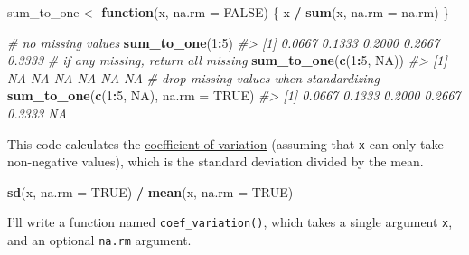 \documentclass[]{book}
\newenvironment{Shaded}{\begin{snugshade}}{\end{snugshade}}
\newcommand{\CommentTok}[1]{\textcolor[rgb]{0.56,0.35,0.01}{\textit{#1}}}
\newcommand{\ControlFlowTok}[1]{\textcolor[rgb]{0.13,0.29,0.53}{\textbf{#1}}}
\newcommand{\DataTypeTok}[1]{\textcolor[rgb]{0.13,0.29,0.53}{#1}}
\newcommand{\DecValTok}[1]{\textcolor[rgb]{0.00,0.00,0.81}{#1}}
\newcommand{\KeywordTok}[1]{\textcolor[rgb]{0.13,0.29,0.53}{\textbf{#1}}}
\newcommand{\NormalTok}[1]{#1}
\newcommand{\OperatorTok}[1]{\textcolor[rgb]{0.81,0.36,0.00}{\textbf{#1}}}
\newcommand{\OtherTok}[1]{\textcolor[rgb]{0.56,0.35,0.01}{#1}}
\newcommand{\StringTok}[1]{\textcolor[rgb]{0.31,0.60,0.02}{#1}}
\theoremstyle{plain}
\theoremstyle{remark}
\begin{document}
\begin{Shaded}
\begin{Highlighting}[]
\NormalTok{sum_to_one <-}\StringTok{ }\ControlFlowTok{function}\NormalTok{(x, }\DataTypeTok{na.rm =} \OtherTok{FALSE}\NormalTok{) \{}
\NormalTok{  x }\OperatorTok{/}\StringTok{ }\KeywordTok{sum}\NormalTok{(x, }\DataTypeTok{na.rm =}\NormalTok{ na.rm)}
\NormalTok{\}}
\end{Highlighting}
\end{Shaded}

\begin{Shaded}
\begin{Highlighting}[]
\CommentTok{# no missing values}
\KeywordTok{sum_to_one}\NormalTok{(}\DecValTok{1}\OperatorTok{:}\DecValTok{5}\NormalTok{)}
\CommentTok{#> [1] 0.0667 0.1333 0.2000 0.2667 0.3333}
\CommentTok{# if any missing, return all missing}
\KeywordTok{sum_to_one}\NormalTok{(}\KeywordTok{c}\NormalTok{(}\DecValTok{1}\OperatorTok{:}\DecValTok{5}\NormalTok{, }\OtherTok{NA}\NormalTok{))}
\CommentTok{#> [1] NA NA NA NA NA NA}
\CommentTok{# drop missing values when standardizing}
\KeywordTok{sum_to_one}\NormalTok{(}\KeywordTok{c}\NormalTok{(}\DecValTok{1}\OperatorTok{:}\DecValTok{5}\NormalTok{, }\OtherTok{NA}\NormalTok{), }\DataTypeTok{na.rm =} \OtherTok{TRUE}\NormalTok{)}
\CommentTok{#> [1] 0.0667 0.1333 0.2000 0.2667 0.3333     NA}
\end{Highlighting}
\end{Shaded}

This code calculates the \href{https://en.wikipedia.org/wiki/Coefficient_of_variation}{coefficient of variation} (assuming that \texttt{x} can only take non-negative values), which is the standard deviation divided by the mean.

\begin{Shaded}
\begin{Highlighting}[]
\KeywordTok{sd}\NormalTok{(x, }\DataTypeTok{na.rm =} \OtherTok{TRUE}\NormalTok{) }\OperatorTok{/}\StringTok{ }\KeywordTok{mean}\NormalTok{(x, }\DataTypeTok{na.rm =} \OtherTok{TRUE}\NormalTok{)}
\end{Highlighting}
\end{Shaded}

I'll write a function named \texttt{coef\_variation()}, which takes a single argument \texttt{x},
and an optional \texttt{na.rm} argument.
\end{document}
